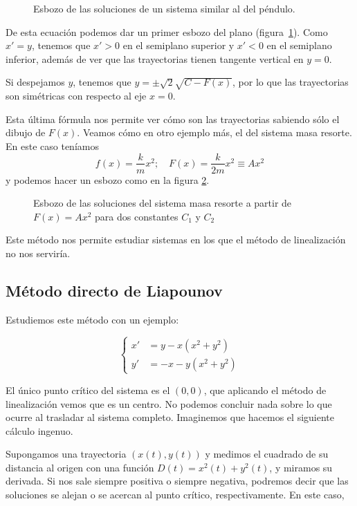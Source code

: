 \begin{figure}[hbtp]
\label{imgEsbozoSist}
\caption{Esbozo de las soluciones de un sistema similar al del péndulo.}
\end{figure}

De esta ecuación podemos dar un primer esbozo del plano (figura \ref{imgEsbozoSist}). Como $x'=y$, tenemos que $x'>0$ en el semiplano superior y $x'<0$ en el semiplano inferior, además de ver que las trayectorias tienen tangente vertical en $y = 0$.

Si despejamos $y$, tenemos que $y = \pm \sqrt{2}\sqrt{C-F(x)}$, por lo que las trayectorias son simétricas con respecto al eje $x = 0$.

Esta última fórmula nos permite ver cómo son las trayectorias sabiendo sólo el dibujo de $F(x)$. Veamos cómo en otro ejemplo más, el del sistema masa resorte. En este caso teníamos \[ f(x) = \frac{k}{m}x^2;\quad F(x) = \frac{k}{2m}x^2 \equiv A x^2 \] y podemos hacer un esbozo como en la figura \ref{img8MasaResorte}.

\begin{figure}[hbtp]
\label{img8MasaResorte}
\caption{Esbozo de las soluciones del sistema masa resorte a partir de $F(x) = A x^2$ para dos constantes $C_1$ y $C_2$}
\end{figure}

Este método nos permite estudiar sistemas en los que el método de linealización no nos serviría.

\subsection{Método directo de Liapounov}

Estudiemos este método con un ejemplo:

\[ \begin{cases} x' &= y-x(x^2+y^2) \\ y' &= -x -y(x^2+y^2) \end{cases} \]

El único punto crítico del sistema es el $(0,0)$, que aplicando el método de linealización vemos que es un centro. No podemos concluir nada sobre lo que ocurre al trasladar al sistema completo. Imaginemos que hacemos el siguiente cálculo ingenuo.

Supongamos una trayectoria $(x(t), y(t))$ y medimos el cuadrado de su distancia al origen con una función $D(t) = x^2(t) + y^2(t)$, y miramos su derivada. Si nos sale siempre positiva o siempre negativa, podremos decir que las soluciones se alejan o se acercan al punto crítico, respectivamente. En este caso,

